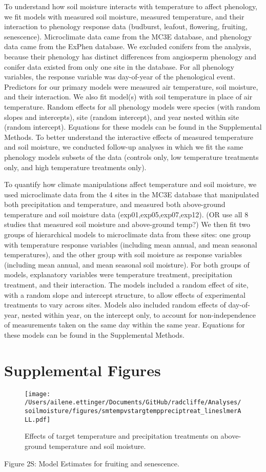 \documentclass{article}
\begin{document}
\par To understand how soil moisture interacts with temperature to affect phenology, we fit models with measured soil moisture, measured temperature, and their interaction to phenology response data (budburst, leafout, flowering, fruiting, senescence). Microclimate data came from the MC3E database, and phenology data came from the ExPhen database. We excluded conifers from the analysis, because their phenology has distinct differences from angiosperm phenology \cite{polgar2014} and conifer data existed from only one site in the database. For all phenology variables, the response variable was day-of-year of the phenological event. Predictors for our primary models were measured air temperature, soil moisture, and their interaction. We also fit model(s) with soil temperature in place of air temperature. Random effects for all phenology models were species (with random slopes and intercepts), site (random intercept), and year nested within site (random intercept). Equations for these models can be found in the Supplemental Methods. 
To better understand the interactive effects of measured temperature and soil moisture, we conducted follow-up analyses in which we fit the same phenology models subsets of the data (controls only, low temperature treatments only, and high temperature treatments only).
\par To quantify how climate manipulations affect temperature and soil moisture, we used microclimate data from the 4 sites in the MC3E database that manipulated both precipitation and temperature, and measured both above-ground temperature and soil moisture data (exp01,exp05,exp07,exp12). (OR use all 8 studies that measured soil moisture and above-ground temp?) We then fit two groups of hierarchical models to microclimate data from these sites: one group with temperature response variables (including mean annual, and mean seasonal temperatures), and the other group with soil moisture as response variables (including mean annual, and mean seasonal soil moisture). For both groups of models, explanatory variables were temperature treatment, precipitation treatment, and their interaction. The models included a random effect of site, with a random slope and intercept structure, to allow effects of experimental treatments to vary across sites. Models also included random effects of day-of-year, nested within year, on the intercept only, to account for non-independence of measurements taken on the same day within the same year. Equations for these models can be found in the Supplemental Methods. 

\section* {Supplemental Figures}
 \begin{figure}[h]
\centering
 \texttt{[image: /Users/ailene.ettinger/Documents/GitHub/radcliffe/Analyses/soilmoisture/figures/smtempvstargtemppreciptreat\_lineslmerALL.pdf]}
 \caption{Effects of target temperature and precipitation treatments on above-ground temperature and soil moisture.} 
 \label{fig:soilmois}
 \end{figure}

Figure 2S: Model Estimates for fruiting and senescence.
\end{document}
